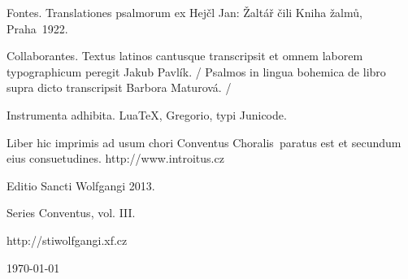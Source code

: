 \documentclass[a4paper, twoside, 12pt]{article}
\newcommand{\annusEditionis}{2013}
\begin{document}
\pagebreak



\pagebreak



\pagebreak



\fancyhead[LE]{\thepage\ / }
\fancyhead[RO]{ / \thepage}




\pagebreak

\pagestyle{empty}

\tableofcontents

\vfill

\pagebreak

Fontes. 
Translationes psalmorum ex
Hejčl Jan: Žaltář čili Kniha žalmů, Praha~1922.

Collaborantes.
Textus latinos cantusque transcripsit et omnem laborem typographicum peregit
Jakub Pavlík. /
Psalmos in lingua bohemica de libro supra dicto transcripsit
Barbora Maturová. /

Instrumenta adhibita.
LuaTeX, %
Gregorio, %
typi Junicode. %

\begin{center}
Liber hic imprimis ad usum chori 
\guillemotright Conventus Choralis\guillemotleft\ 
paratus est
et secundum eius consuetudines.
http://www.introitus.cz

\vspace{1cm}

{\large Editio Sancti Wolfgangi \annusEditionis .}

\vspace{2mm}

Series \guillemotright Conventus\guillemotleft, vol. III.

\vspace{1cm}

http://stiwolfgangi.xf.cz

\vfill

\today

\end{center}
\end{document}
